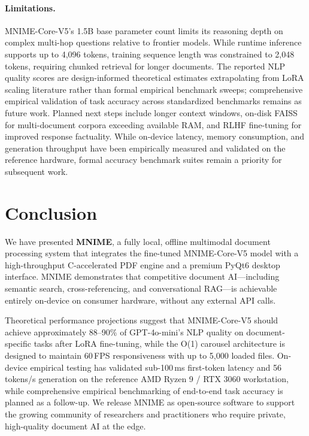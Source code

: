 \documentclass[11pt]{article}
\begin{document}
\paragraph{Limitations.}
MNIME-Core-V5's 1.5B base parameter count limits its reasoning depth on complex
multi-hop questions relative to frontier models.
While runtime inference supports up to 4,096 tokens, training sequence length
was constrained to 2,048 tokens, requiring chunked retrieval for longer documents.
The reported NLP quality scores are design-informed theoretical estimates
extrapolating from LoRA scaling literature rather than formal empirical benchmark sweeps;
comprehensive empirical validation of task accuracy across standardized benchmarks
remains as future work.
Planned next steps include longer context windows, on-disk FAISS for
multi-document corpora exceeding available RAM, and RLHF fine-tuning for
improved response factuality. While on-device latency, memory consumption, and
generation throughput have been empirically measured and validated on the reference hardware,
formal accuracy benchmark suites remain a priority for subsequent work.

\section{Conclusion}
\label{sec:conclusion}

We have presented \textbf{MNIME}, a fully local, offline multimodal document
processing system that integrates the fine-tuned MNIME-Core-V5 model with a
high-throughput C-accelerated PDF engine and a premium PyQt6 desktop
interface.
MNIME demonstrates that competitive document AI---including semantic search,
cross-referencing, and conversational RAG---is achievable entirely on-device
on consumer hardware, without any external API calls.

Theoretical performance projections suggest that MNIME-Core-V5 should
achieve approximately 88--90\% of GPT-4o-mini's NLP quality on
document-specific tasks after LoRA fine-tuning, while the O(1) carousel
architecture is designed to maintain 60\,FPS responsiveness with up to
5,000 loaded files.
On-device empirical testing has validated sub-100\,ms first-token latency
and 56\,tokens/s generation on the reference AMD Ryzen 9 / RTX 3060 workstation,
while comprehensive empirical benchmarking of end-to-end task accuracy is planned
as a follow-up.
We release MNIME as open-source software to support the growing community of
researchers and practitioners who require private, high-quality document AI
at the edge.
\end{document}
